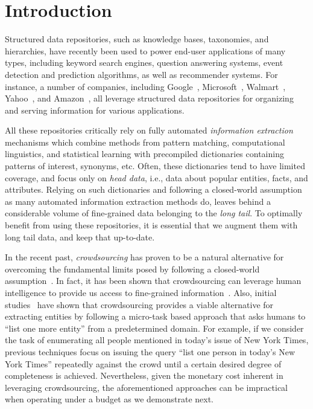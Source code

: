 


\section{Introduction}
\label{sec:intro}

Structured data repositories, such as knowledge bases, taxono\-mies, and hierarchies, have recently been used to power end-user applications of many types, including keyword search engines, question answering systems, event detection and prediction algorithms, as well as recommender systems. For instance, a number of companies, including Google~\cite{singhal2012introducing}, Microsoft~\cite{cheng2010fuzzy}, Walmart~\cite{Deshpande:2013:BMU:2463676.2465297}, Yahoo~\cite{woo}, and Amazon~\cite{amazon-product}, all leverage structured data repositories for organizing and serving information for various applications. 

All these repositories critically rely on fully automated {\em information extraction} mechanisms which combine methods from pattern matching, computational linguistics, and statistical learning with precompiled dictionaries containing patterns of interest, synonyms, etc. Often, these dictionaries tend to have limited coverage, and focus only on {\em head data}, i.e., data about popular entities, facts, and attributes. Relying on such dictionaries and following a closed-world assumption as many automated information extraction methods do, leaves behind a considerable volume of fine-grained data belonging to the {\em long tail}. To optimally benefit from using these repositories, it is essential that we augment them with long tail data, and keep that up-to-date. 

In the recent past, {\em crowdsourcing} has proven to be a natural alternative for overcoming the fundamental limits posed by following a closed-world assumption~\cite{franklin:2011}. In fact, it has been shown that crowdsourcing can leverage human intelligence to provide us access to fine-grained information~\cite{deco}. Also, initial studies~\cite{trushkowsky:2013, amsterdamer:2014} have shown that crowdsourcing provides a viable alternative for extracting entities by following a micro-task based approach that asks humans to ``list one more entity'' from a predetermined domain. For example, if we consider the task of enumerating all people mentioned in today's issue of New York Times, previous techniques focus on issuing the query ``list one person in today's New York Times'' repeatedly against the crowd until a certain desired degree of completeness is achieved. Nevertheless, given the monetary cost inherent in leveraging crowdsourcing, the aforementioned approaches can be impractical when operating under a budget as we demonstrate next.

